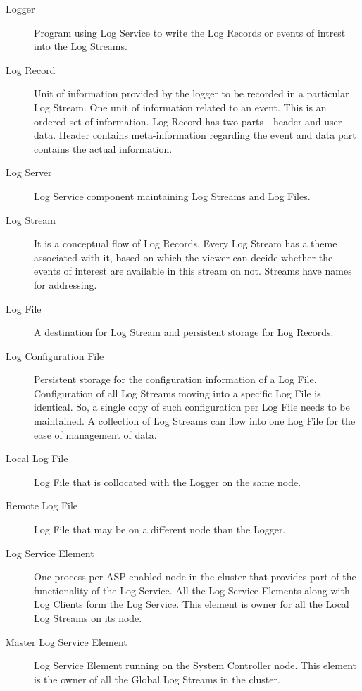 \begin{flushleft}
\begin{itemize}
\begin{Desc}
\begin{description}
\item[Logger] Program using Log Service to write the Log Records or events of intrest into the Log Streams.

\item[Log Record] Unit of information provided by the logger to be recorded in a particular Log Stream. One unit of information related to an event.
This is an ordered set of information. Log Record has two parts - header and user data. 
Header contains meta-information regarding the event and data part contains the actual information.

\item[Log Server] Log Service component maintaining Log Streams and Log Files.

\item[Log Stream] It is a conceptual flow of Log Records. Every Log Stream has a theme associated with it, based on which the viewer can decide 
whether the events of interest are available in this stream on not. Streams have names for addressing.

\item[Log File] A destination for Log Stream and persistent storage for Log Records.

\item[Log Configuration File] Persistent storage for the configuration information of a Log File. Configuration of all Log Streams moving 
into a specific Log File is identical. So, a single copy of such configuration per Log File needs to be maintained.
A collection of Log Streams can flow into one Log File for the ease of management of data.

\item[Local Log File] Log File that is collocated with the Logger on the same node.

\item[Remote Log File] Log File that may be on a different node than the Logger.

\item[Log Service Element] One process per ASP enabled node in the cluster that provides part of the functionality of the Log Service. All the Log 
Service Elements along with Log Clients form the Log Service. This element is owner for all the Local Log Streams on its node.

\item[Master Log Service Element] Log Service Element running on the System Controller node. This element is the owner of all the Global Log Streams 
in the cluster.


\end{description}
\end{Desc}
\end{itemize}
\end{flushleft}
